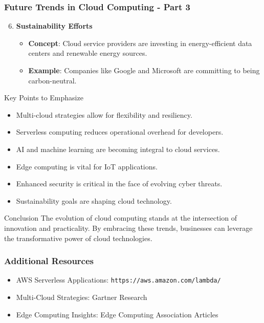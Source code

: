 \documentclass[aspectratio=169]{beamer}
\begin{document}
\begin{frame}[fragile]
    \frametitle{Future Trends in Cloud Computing - Part 3}
    \begin{enumerate}
        \setcounter{enumi}{5} %
        \item \textbf{Sustainability Efforts}
        \begin{itemize}
            \item \textbf{Concept}: Cloud service providers are investing in energy-efficient data centers and renewable energy sources.
            \item \textbf{Example}: Companies like Google and Microsoft are committing to being carbon-neutral.
        \end{itemize}
    \end{enumerate}

    \begin{block}{Key Points to Emphasize}
        \begin{itemize}
            \item Multi-cloud strategies allow for flexibility and resiliency.
            \item Serverless computing reduces operational overhead for developers.
            \item AI and machine learning are becoming integral to cloud services.
            \item Edge computing is vital for IoT applications.
            \item Enhanced security is critical in the face of evolving cyber threats.
            \item Sustainability goals are shaping cloud technology.
        \end{itemize}
    \end{block}

    \begin{block}{Conclusion}
        The evolution of cloud computing stands at the intersection of innovation and practicality. By embracing these trends, businesses can leverage the transformative power of cloud technologies.
    \end{block}
\end{frame}

\begin{frame}[fragile]
    \frametitle{Additional Resources}
    \begin{itemize}
        \item AWS Serverless Applications: \texttt{https://aws.amazon.com/lambda/}
        \item Multi-Cloud Strategies: Gartner Research
        \item Edge Computing Insights: Edge Computing Association Articles
    \end{itemize}
\end{frame}
\end{document}
